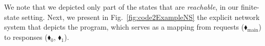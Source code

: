 

We note that we depicted only part of the states that are \textit{reachable}, in our finite-state setting.
%
Next, we present in Fig.~\ref{fig:code2ExampleNS} the explicit network system that depicts the program, which serves as a mapping from requests ({\color{ForestGreen}$\blacklozenge_\text{main}$}) to responses ({\color{red}$\blacklozenge_0$}, {\color{red}$\blacklozenge_1$}).






